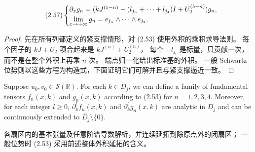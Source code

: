 \begin{equation}
\originaleq{2.57}
\begin{cases}
\partial_x g_n=(kJ^{(5-n)}-(l_{j_n}+\cdots+l_{j_4})I+U_2^{(5-n)})g_n,\\
\displaystyle\lim\limits_{x\to+\infty}g_n=e_{j_n}\wedge\cdots\wedge e_{j_4},
\end{cases}
\end{equation}
\begin{proof}
先在所有列都定义的紧支撑情形，对 (2.53) 使用外积的乘积求导法则。
每个因子的 $kJ+U_2$ 项合起来是 $kJ^{(n)}+U_2^{(n)}$，
每个 $-l_{j_i}$ 是标量，只贡献一次，而不是在整个外积上再乘 $n$ 次。
端点归一化给出标准基的外积。
一般 Schwartz 位势则以这些方程为构造式，下面证明它们可解并且与紧支撑逼近一致。
\end{proof}
\begin{paperpropositionen}\label{prop:2.9}
Suppose $u_0,v_0\in\mathcal S(\mathbb R)$. For each $k\in D_j$, we can define a family of fundamental tensors $f_n(x,k)$ and $g_n(x,k)$ according to (2.53) for $n=1,2,3,4$.
Moreover, for each integer $l\ge0$, $\partial_k^l f_n(x,k)$ and $\partial_k^l g_n(x,k)$ are analytic in $D_j$ and can be continuously extended to $\overline D_j\setminus\{0\}$.
\end{paperpropositionen}
\begin{paperpropositioncn*}
各扇区内的基本张量及任意阶谱导数解析，并连续延拓到除原点外的闭扇区；
一般位势时 (2.53) 采用前述整体外积延拓的含义。
\end{paperpropositioncn*}
